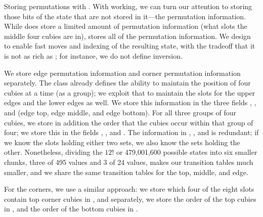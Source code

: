 Storing permutations with .
With  working, we can turn our attention to storing those
bits of the state that are not stored in it---the permutation
information.  While  does store a limited amount of
permutation information (what slots the middle four cubies are in),
 stores all of the permutation information.  We design
 to enable fast moves and indexing of the resulting
state, with the tradeoff that it is not as rich as ;
for instance, we do not define inversion.

We store edge permutation information and corner permutation
information separately.  The  class already defines the
ability to maintain the position of four cubies at a time (as a
group); we exploit that to maintain the slots for the upper edges and
the lower edges as well.  We store this information in the three
fields , , and  (edge top, edge middle, and
edge bottom).
For all three groups of four cubies, we store in addition the order
that the cubies occur within that group of four; we store this in the
fields , , and .  The information in , , and
 is redundant; if we know the slots holding either two sets, we
also know the sets holding the other.  Nonetheless, dividing the $12!$
or 479,001,600 possible states into six smaller chunks, three of 495
values and 3 of 24 values, makes our transition tables much smaller,
and we share the same transition tables for the top, middle, and edge.

For the corners, we use a similar approach: we store which four of the
eight slots contain top corner cubies in , and separately, we
store the order of the top cubies in , and the order of the
bottom cubies in .

